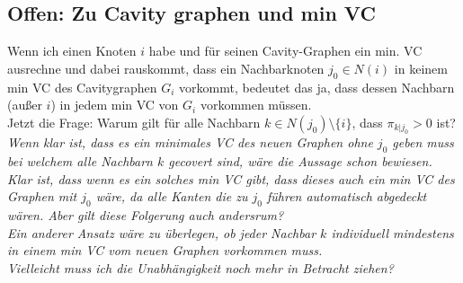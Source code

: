 \documentclass[paper=a4,10pt]{scrartcl}
\begin{document}
\subsection{Offen: Zu Cavity graphen und min VC}
Wenn ich einen Knoten $i$ habe und für seinen Cavity-Graphen ein min. VC ausrechne und dabei rauskommt, dass ein Nachbarknoten $j_0 \in N(i)$ in keinem min VC des Cavitygraphen $G_i$ vorkommt, bedeutet das ja, dass dessen Nachbarn (außer $i$) in jedem min VC von $G_i$ vorkommen müssen.\\
Jetzt die Frage: Warum gilt für alle Nachbarn $k \in N(j_0) \setminus \{i\}$, dass $\pi_{k|j_0} > 0$ ist? \\
\textit{Wenn klar ist, dass es ein minimales VC des neuen Graphen ohne $j_0$ geben muss bei welchem alle Nachbarn $k$ gecovert sind, wäre die Aussage schon bewiesen. Klar ist, dass wenn es ein solches min VC gibt, dass dieses auch ein min VC des Graphen mit $j_0$ wäre, da alle Kanten die zu $j_0$ führen automatisch abgedeckt wären. Aber gilt diese Folgerung auch andersrum?\\
Ein anderer Ansatz wäre zu überlegen, ob jeder Nachbar $k$ individuell mindestens in einem min VC vom neuen Graphen vorkommen muss.\\
Vielleicht muss ich die Unabhängigkeit noch mehr in Betracht ziehen?}\\
\\
\end{document}
